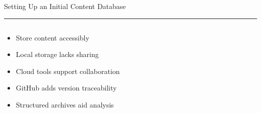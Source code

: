 \documentclass[aspectratio=169]{beamer}
\newcommand{\TitleFont}{\rmfamily}
\begin{document}
\begin{frame}[t]{}
  \vspace*{0.5cm}
  {\TitleFont\fontsize{18}{22}\selectfont\color{LUBronze}Setting Up an Initial Content Database\par}
  \vspace{0.3em}
  {\color{LUBronze}\rule{\linewidth}{0.8pt}}\par
  \vspace{0.2cm}
  \begin{columns}[t]
    \begin{column}[t]{0.45\textwidth}
      \vspace*{0pt}
      \begin{itemize}\setlength\itemsep{0.65em}
        \item Store content accessibly
        \item Local storage lacks sharing
        \item Cloud tools support collaboration
        \item GitHub adds version traceability
        \item Structured archives aid analysis
      \end{itemize}
    \end{column}
  \end{columns}
\end{frame}
\end{document}
